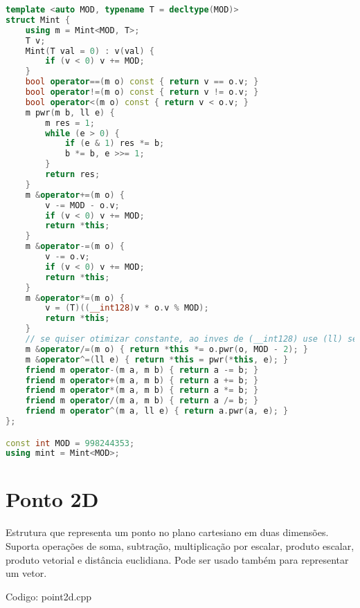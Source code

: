 \documentclass[10pt, a4paper, oneside]{book}
\begin{document}
\begin{lstlisting}[language=C++]
template <auto MOD, typename T = decltype(MOD)>
struct Mint {
    using m = Mint<MOD, T>;
    T v;
    Mint(T val = 0) : v(val) {
        if (v < 0) v += MOD;
    }
    bool operator==(m o) const { return v == o.v; }
    bool operator!=(m o) const { return v != o.v; }
    bool operator<(m o) const { return v < o.v; }
    m pwr(m b, ll e) {
        m res = 1;
        while (e > 0) {
            if (e & 1) res *= b;
            b *= b, e >>= 1;
        }
        return res;
    }
    m &operator+=(m o) {
        v -= MOD - o.v;
        if (v < 0) v += MOD;
        return *this;
    }
    m &operator-=(m o) {
        v -= o.v;
        if (v < 0) v += MOD;
        return *this;
    }
    m &operator*=(m o) {
        v = (T)((__int128)v * o.v % MOD);
        return *this;
    }
    // se quiser otimizar constante, ao inves de (__int128) use (ll) se o T for `int`
    m &operator/=(m o) { return *this *= o.pwr(o, MOD - 2); }
    m &operator^=(ll e) { return *this = pwr(*this, e); }
    friend m operator-(m a, m b) { return a -= b; }
    friend m operator+(m a, m b) { return a += b; }
    friend m operator*(m a, m b) { return a *= b; }
    friend m operator/(m a, m b) { return a /= b; }
    friend m operator^(m a, ll e) { return a.pwr(a, e); }
};

const int MOD = 998244353;
using mint = Mint<MOD>;
\end{lstlisting}
\hfill

\section{Ponto 2D}


Estrutura que representa um ponto no plano cartesiano em duas dimensões. Suporta operações de soma, subtração, multiplicação por escalar, produto escalar, produto vetorial e distância euclidiana. Pode ser usado também para representar um vetor.

\hfill

Codigo: point2d.cpp
\end{document}
